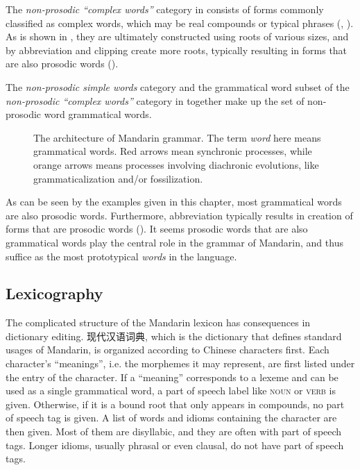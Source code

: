 \documentclass[UTF8, a4paper, oneside, scheme=plain, 12pt]{ctexrep}
\newcommand*{\term}[1]{\emph{#1}}
\newcommand*{\category}[1]{\textsc{#1}}
\begin{document}
The \term{non-prosodic ``complex words''} category in 
consists of forms commonly classified as complex words,
which may be real compounds or typical phrases 
(, ).
As is shown in ,
they are ultimately constructed using roots of various sizes,
and by abbreviation and clipping create more roots,
typically resulting in forms that are also prosodic words
().

The \term{non-prosodic simple words} category 
and the grammatical word subset of the \term{non-prosodic ``complex words''} category
in 
together make up the set of non-prosodic word grammatical words.

\begin{figure}[H]
    \centering
    
    \caption{The architecture of Mandarin grammar. The term \term{word} here means grammatical words.
    Red arrows mean synchronic processes,
    while orange arrows means processes involving diachronic evolutions,
    like grammaticalization and/or fossilization.}
    \label{fig:grammar-architecture}
\end{figure}

As can be seen by the examples given in this chapter,
most grammatical words are also prosodic words.
Furthermore, abbreviation typically results in creation of forms that are prosodic words
().
It seems prosodic words that are also grammatical words play the central role 
in the grammar of Mandarin,
and thus suffice as the most prototypical \term{words} in the language.

\subsection{Lexicography}

The complicated structure of the Mandarin lexicon has consequences in dictionary editing.
现代汉语词典, which is the dictionary that defines standard usages of Mandarin,
is organized according to Chinese characters first.
Each character's ``meanings'',
i.e. the morphemes it may represent,
are first listed under the entry of the character.
If a ``meaning'' corresponds to a lexeme and can be used as a single grammatical word,
a part of speech label like \category{noun} or \category{verb} is given.
Otherwise, if it is a bound root that only appears in compounds,
no part of speech tag is given.
A list of words and idioms containing the character are then given.
Most of them are disyllabic, and they are often with part of speech tags.
Longer idioms, usually phrasal or even clausal,
do not have part of speech tags.
\end{document}
